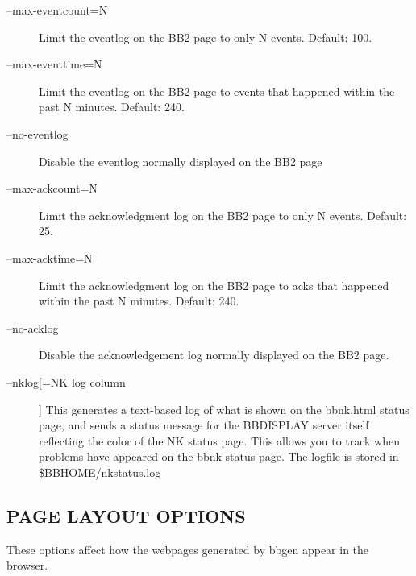 \begin{description}
 

\item[--max-eventcount=N] Limit the eventlog on the BB2 page to only N
  events. Default: 100. 


 

\item[--max-eventtime=N] Limit the eventlog on the BB2 page to events
  that happened within the past N minutes. Default: 240. 


 

\item[--no-eventlog] Disable the eventlog normally displayed on the BB2 page 

 

\item[--max-ackcount=N] Limit the acknowledgment log on the BB2 page to only N events. Default: 25. 

 

\item[--max-acktime=N] Limit the acknowledgment log on the BB2 page to acks that happened within the past N minutes. Default: 240. 

 

\item[--no-acklog] Disable the acknowledgement log normally displayed on the BB2 page. 

 

\item[--nklog[=NK log column]] This generates a text-based log of what
  is shown on the bbnk.html status page, and sends a status message
  for the BBDISPLAY server itself reflecting the color of the NK
  status page. This allows you to track when problems have appeared on
  the bbnk status page. The logfile is stored in \$BBHOME/nkstatus.log 



 


\end{description}

\subsection{PAGE LAYOUT OPTIONS}
 These options affect how the webpages generated by bbgen appear in the browser. 

